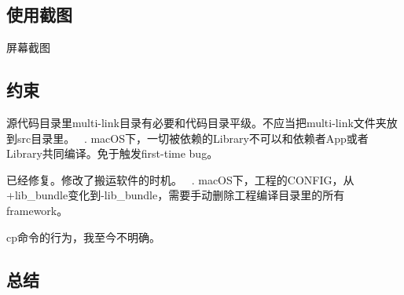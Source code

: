 \subsection*{使用截图}

屏幕截图 ~\newline


\subsection*{约束}


\begin{DoxyEnumerate}
\item 源代码目录里multi-\/link目录有必要和代码目录平级。不应当把multi-\/link文件夹放到src目录里。 ~. mac\+O\+S下，一切被依赖的\+Library不可以和依赖者\+App或者\+Library共同编译。免于触发first-\/time bug。
\begin{DoxyItemize}
\item 已经修复。修改了搬运软件的时机。 ~. mac\+O\+S下，工程的\+C\+O\+N\+F\+I\+G，从+lib\+\_\+bundle变化到-\/lib\+\_\+bundle，需要手动删除工程编译目录里的所有framework。
\item cp命令的行为，我至今不明确。
\end{DoxyItemize}
\end{DoxyEnumerate}

\subsection*{总结}

